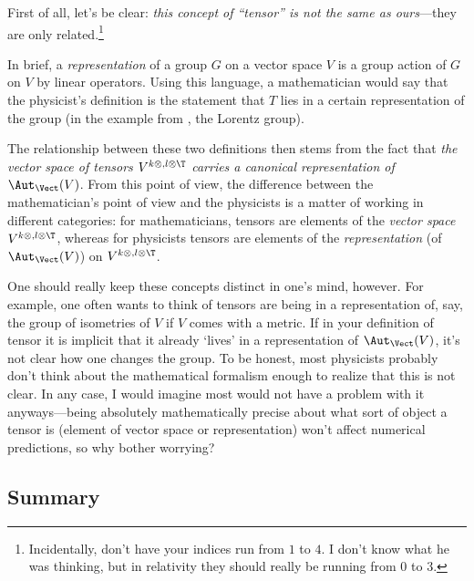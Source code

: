 First of all, let's be clear:  \emph{this concept of ``tensor'' is \emph{not} the same as ours}---they are only related.\footnote{Incidentally, don't have your indices run from $1$ to $4$.  I don't know what he was thinking, but in relativity they should really be running from $0$ to $3$.}

In brief, a \emph{representation} of a group $G$ on a vector space $V$ is a group action of $G$ on $V$ by linear operators.  Using this language, a mathematician would say that the physicist's definition is the statement that $T$ lies in a certain representation of the group (in the example from \cite{Taylor}, the Lorentz group).

The relationship between these two definitions then stems from the fact that \emph{the vector space of tensors $V^{k\otimes ,l\otimes \T}$ carries a canonical representation of $\Aut _{\Vect}(V)$}.  From this point of view, the difference between the mathematician's point of view and the physicists is a matter of working in different categories:  for mathematicians, tensors are elements of the \emph{vector space} $V^{k\otimes ,l\otimes \T}$, whereas for physicists tensors are elements of the \emph{representation} (of $\Aut _{\Vect}(V)$) on $V^{k\otimes ,l\otimes \T}$.

One should really keep these concepts distinct in one's mind, however.  For example, one often wants to think of tensors are being in a representation of, say, the group of isometries of $V$ if $V$ comes with a metric.  If in your definition of tensor it is implicit that it already `lives' in a representation of $\Aut _{\Vect}(V)$, it's not clear how one changes the group.  To be honest, most physicists probably don't think about the mathematical formalism enough to realize that this is not clear.  In any case, I would imagine most would not have a problem with it anyways---being absolutely mathematically precise about what sort of object a tensor is (element of vector space or representation) won't affect numerical predictions, so why bother worrying?

\subsection{Summary}\label{sbsTensorSummary}

